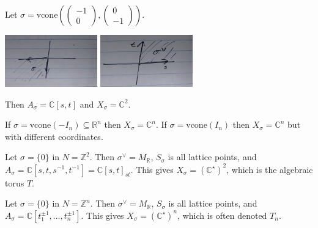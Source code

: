 \documentclass[a4paper,12pt]{amsart}
\newcommand{\ZZ}{\mathbb{Z}}
\newcommand{\RR}{\mathbb{R}}
\newcommand{\CC}{\mathbb{C}}
\begin{document}
\begin{Eg}
Let $\sigma = \mathrm{vcone}\left(\begin{pmatrix}-1\\0\end{pmatrix}, \begin{pmatrix}0\\-1\end{pmatrix}\right)$.

\includegraphics[width=0.3\textwidth]{pic/lec04-pic1}
\includegraphics[width=0.3\textwidth]{pic/lec04-pic2}

Then $A_\sigma = \CC[s, t]$ and $X_\sigma = \CC^2$.
\end{Eg}

\begin{Eg}
If $\sigma = \mathrm{vcone}(-I_n) \subseteq \RR^n$ then $X_\sigma = \CC^n$.
If $\sigma = \mathrm{vcone}(I_n)$ then $X_\sigma = \CC^n$ but with different coordinates.
\end{Eg}

\begin{Eg}
Let $\sigma = \{0\}$ in $N = \ZZ^2$.
Then $\sigma^\vee = M_\RR$, $S_\sigma$ is all lattice points, and $A_\sigma = \CC[s,t,s^{-1},t^{-1}] = \CC[s, t]_{st}$.
This gives $X_\sigma = (\CC^\star)^2$, which is the algebraic torus $T$.
\end{Eg}

\begin{Eg}
Let $\sigma = \{0\}$ in $N = \ZZ^n$.
Then $\sigma^\vee = M_\RR$, $S_\sigma$ is all lattice points, and $A_\sigma = \CC[t_1^{\pm 1}, \dots, t_n^{\pm 1}]$.
This gives $X_\sigma = (\CC^\star)^n$, which is often denoted $T_n$.
\end{Eg}
\end{document}
